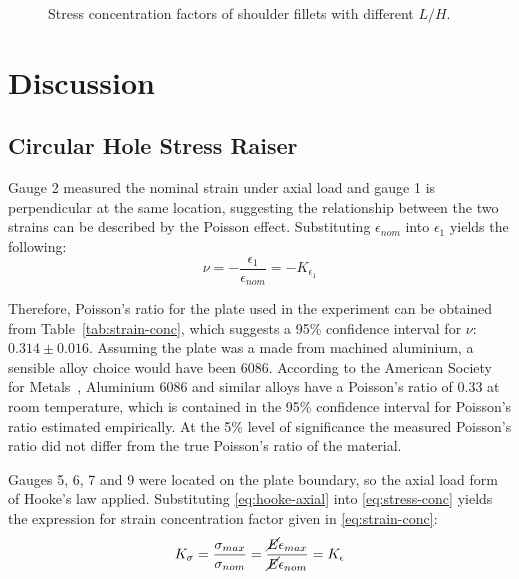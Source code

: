 \documentclass[a4paper,11pt,twocolumn]{article}
\begin{document}
\begin{figure}[H]
    \small
    \centering
    \def\svgwidth{\linewidth}
    
    \caption{Stress concentration factors of shoulder fillets with different
        $L/H$.}
    \label{fig:simulation-results-length}
\end{figure}

\section{Discussion}

\subsection{Circular Hole Stress Raiser}

Gauge 2 measured the nominal strain under axial load and gauge 1 is
perpendicular at the same location, suggesting the relationship between the
two strains can be described by the Poisson effect. Substituting
$\epsilon_{nom}$ into $\epsilon_1$ yields the following:
\begin{equation*}
    \nu = -\frac{\epsilon_1}{\epsilon_{nom}} = -K_{\epsilon_1}
\end{equation*}

Therefore, Poisson's ratio for the plate used in the experiment can be obtained
from Table~\vref{tab:strain-conc}, which suggests a 95\% confidence interval
for $\nu$: $0.314\pm0.016$. Assuming the plate was a made from machined
aluminium, a sensible alloy choice would have been 6086. According to the
American Society for Metals~\cite{asm1978metals}, Aluminium 6086 and similar
alloys have a Poisson's ratio of 0.33 at room temperature, which is contained in
the 95\% confidence interval for Poisson's ratio estimated empirically. At the
5\% level of significance the measured Poisson's ratio did not differ from the
true Poisson's ratio of the material.

Gauges 5, 6, 7 and 9 were located on the plate boundary, so the axial load
form of Hooke's law applied. Substituting \eqref{eq:hooke-axial} into 
\eqref{eq:stress-conc} yields the expression for strain concentration factor 
given in \eqref{eq:strain-conc}:
\begin{equation} \label{eq:equiv-conc}
    K_\sigma = \frac{\sigma_{max}}{\sigma_{nom}}
             = \frac{\cancel{E}\epsilon_{max}}{\cancel{E}\epsilon_{nom}}
             = K_\epsilon
\end{equation}
\end{document}

